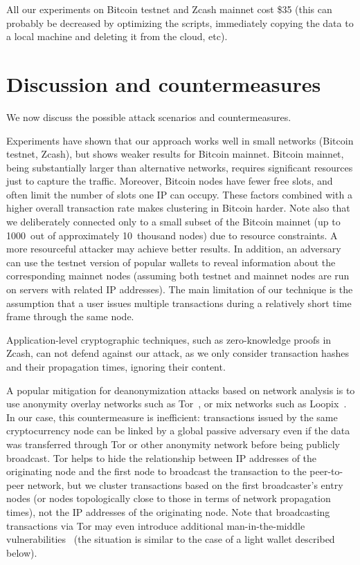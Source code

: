 All our experiments on Bitcoin testnet and Zcash mainnet cost \$35 (this can probably be decreased by optimizing the scripts, immediately copying the data to a local machine and deleting it from the cloud, etc).


\section{Discussion and countermeasures}

We now discuss the possible attack scenarios and countermeasures.

Experiments have shown that our approach works well in small networks (Bitcoin testnet, Zcash), but shows weaker results for Bitcoin mainnet.
Bitcoin mainnet, being substantially larger than alternative networks, requires significant resources just to capture the traffic.
Moreover, Bitcoin nodes have fewer free slots, and often limit the number of slots one IP can occupy.
These factors combined with a higher overall transaction rate makes clustering in Bitcoin harder.
Note also that we deliberately connected only to a small subset of the Bitcoin mainnet (up to 1000~out of approximately 10~thousand nodes) due to resource constraints.
A more resourceful attacker may achieve better results.
In addition, an adversary can use the testnet version of popular wallets to reveal information about the corresponding mainnet nodes (assuming both testnet and mainnet nodes are run on servers with related IP addresses).
The main limitation of our technique is the assumption that a user issues multiple transactions during a relatively short time frame through the same node.

Application-level cryptographic techniques, such as zero-knowledge proofs in Zcash, can not defend against our attack, as we only consider transaction hashes and their propagation times, ignoring their content.

A popular mitigation for deanonymization attacks based on network analysis is to use anonymity overlay networks such as Tor~\cite{Tor}, or mix networks such as Loopix~\cite{Piotrowska2017}.
In our case, this countermeasure is inefficient: transactions issued by the same cryptocurrency node can be linked by a global passive adversary even if the data was transferred through Tor or other anonymity network before being publicly broadcast.
Tor helps to hide the relationship between IP addresses of the originating node and the first node to broadcast the transaction to the peer-to-peer network, but we cluster transactions based on the first broadcaster's entry nodes (or nodes topologically close to those in terms of network propagation times), not the IP addresses of the originating node.
Note that broadcasting transactions via Tor may even introduce additional man-in-the-middle vulnerabilities~\cite{Biryukov2015} (the situation is similar to the case of a light wallet described below).

